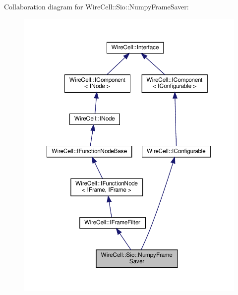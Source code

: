 Collaboration diagram for Wire\+Cell\+:\+:Sio\+:\+:Numpy\+Frame\+Saver\+:
\nopagebreak
\begin{figure}[H]
\begin{center}
\leavevmode
\includegraphics[width=350pt]{class_wire_cell_1_1_sio_1_1_numpy_frame_saver__coll__graph}
\end{center}
\end{figure}

